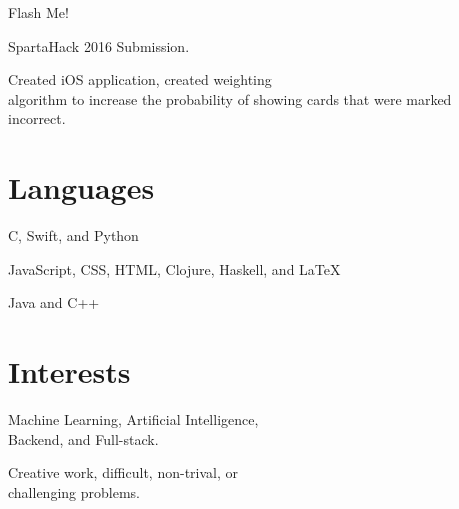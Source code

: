 \documentclass{tccv}
\newenvironment{itemize*}%
{\begin{itemize}%
    \vspace{-0.7em}
    \setlength{\itemsep}{0pt}%
    \setlength{\parskip}{0pt}}%
  {\end{itemize}}
\begin{document}
\begin{projectlist}
  {Flash Me!}
  \begin{itemize*}
  \item SpartaHack 2016 Submission.
  \item Created iOS application, created weighting \\
    algorithm to increase the probability of showing cards that were marked incorrect.
  \end{itemize*}

\end{projectlist}

\section{Languages}

\begin{factlist}

  {C, Swift, and Python}

  {JavaScript, CSS, HTML, Clojure, Haskell, and LaTeX}

  {Java and C++}

\end{factlist}

\section{Interests}
\begin{itemize*}
\item Machine Learning, Artificial Intelligence, \\
  Backend, and Full-stack.
\item Creative work, difficult, non-trival, or \\
  challenging problems.
\end{itemize*}
\end{document}
